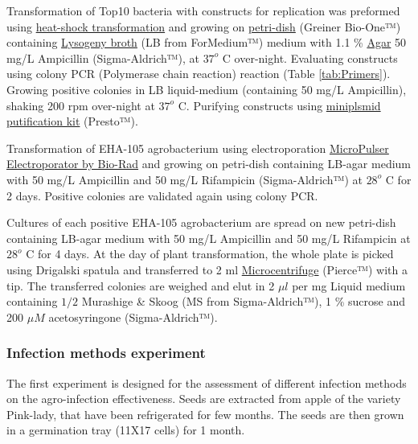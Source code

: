 \documentclass[
]{article}
\begin{document}
Transformation of Top10 bacteria with constructs for replication was
preformed using
\href{https://www.addgene.org/protocols/bacterial-transformation/}{heat-shock
transformation} and growing on
\href{https://shop.gbo.com/en/row/products/bioscience/microbiology-bacteriology/dishes/petri-dishes/}{petri-dish}
(Greiner Bio-One™) containing
\href{https://www.formedium.com/product/lb-broth-lennox/}{Lysogeny
broth} (LB from ForMedium™) medium with 1.1 \%
\href{https://www.formedium.com/product/agar/}{Agar} 50 mg/L Ampicillin
(Sigma-Aldrich™), at \(37^o\) C over-night. Evaluating constructs using
colony PCR (Polymerase chain reaction) reaction (Table
\ref{tab:Primers}). Growing positive colonies in LB liquid-medium
(containing 50 mg/L Ampicillin), shaking 200 rpm over-night at \(37^o\)
C. Purifying constructs using
\href{https://www.geneaid.com/product.php?act=view\&id=180}{miniplsmid
putification kit} (Presto™).

Transformation of EHA-105 agrobacterium using electroporation
\href{https://www.bio-rad.com/en-il/product/micropulser-electroporator?ID=83527990-34fb-4b33-b955-ca53b57bf8b9}{MicroPulser
Electroporator by Bio-Rad} and growing on petri-dish containing LB-agar
medium with 50 mg/L Ampicillin and 50 mg/L Rifampicin (Sigma-Aldrich™)
at \(28^o\) C for 2 days. Positive colonies are validated again using
colony PCR.

Cultures of each positive EHA-105 agrobacterium are spread on new
petri-dish containing LB-agar medium with 50 mg/L Ampicillin and 50 mg/L
Rifampicin at \(28^o\) C for 4 days. At the day of plant transformation,
the whole plate is picked using Drigalski spatula and transferred to 2
ml
\href{https://www.thermofisher.com/order/catalog/product/69720\#/69720}{Microcentrifuge}
(Pierce™) with a tip. The transferred colonies are weighed and elut in 2
\(\mu l\) per mg Liquid medium containing \(1/2\) Murashige \& Skoog (MS
from Sigma-Aldrich™), 1 \% sucrose and 200 \(\mu M\) acetosyringone
(Sigma-Aldrich™).

\hypertarget{infection-methods-experiment}{%
\subsubsection{Infection methods
experiment}\label{infection-methods-experiment}}

The first experiment is designed for the assessment of different
infection methods on the agro-infection effectiveness. Seeds are
extracted from apple of the variety Pink-lady, that have been
refrigerated for few months. The seeds are then grown in a germination
tray (11X17 cells) for 1 month.
\end{document}
